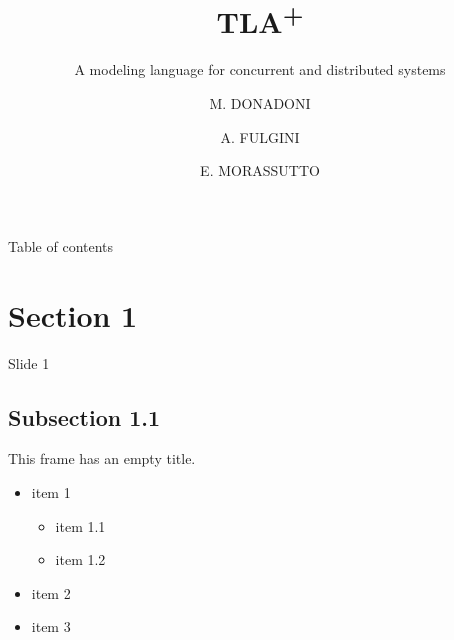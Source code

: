 \documentclass{beamer}
\title{TLA\texorpdfstring{\textsuperscript{+}}{+}}
\subtitle{%
    A modeling language for
    \texorpdfstring{\linebreak}{}%
    concurrent and distributed systems
}
\author{M. DONADONI \and A. FULGINI \and E. MORASSUTTO}
\begin{document}
    \begin{frame}
        \maketitle
    \end{frame}
    
    \begin{frame}{Table of contents}
      \tableofcontents
    \end{frame}
    
    \section[image=bgphoto_cut]{Section 1}
    \begin{frame}[plain]{}
        \sectionpage
    \end{frame}
    
    \begin{frame}{Slide 1}
        \lipsum[1]
    \end{frame}
    
    \subsection{Subsection 1.1}
    \begin{frame}[plain]{}
        \subsectionpage
    \end{frame}
    \begin{frame}
        This frame has an empty title.
        \vfill
        \begin{itemize}
            \item item 1
            \begin{itemize}
                \item item 1.1
                \item item 1.2
            \end{itemize}
            \item item 2
            \item item 3
        \end{itemize}
    \end{frame}
    
\end{document}
